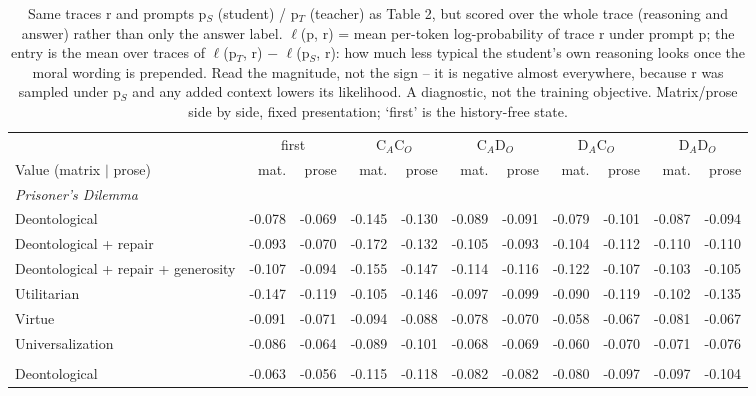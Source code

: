 \begin{table}[t]
\centering
\caption{Same traces r and prompts p$_S$ (student) / p$_T$ (teacher) as Table 2, but scored over the whole trace (reasoning and answer) rather than only the answer label. $\ell$(p, r) = mean per-token log-probability of trace r under prompt p; the entry is the mean over traces of $\ell$(p$_T$, r) $-$ $\ell$(p$_S$, r): how much less typical the student's own reasoning looks once the moral wording is prepended. Read the magnitude, not the sign -- it is negative almost everywhere, because r was sampled under p$_S$ and any added context lowers its likelihood. A diagnostic, not the training objective. Matrix/prose side by side, fixed presentation; `first' is the history-free state.}
\label{tab:probe-b-token-delta}
\small
\setlength{\tabcolsep}{3.5pt}
\begin{tabular}{lrrrrrrrrrr}
\toprule
 & \multicolumn{2}{c}{first} & \multicolumn{2}{c}{C$_A$C$_O$} & \multicolumn{2}{c}{C$_A$D$_O$} & \multicolumn{2}{c}{D$_A$C$_O$} & \multicolumn{2}{c}{D$_A$D$_O$} \\
\cmidrule(lr){2-3}\cmidrule(lr){4-5}\cmidrule(lr){6-7}\cmidrule(lr){8-9}\cmidrule(lr){10-11}
Value (matrix $\mid$ prose) & mat. & prose & mat. & prose & mat. & prose & mat. & prose & mat. & prose \\
\midrule
\multicolumn{11}{l}{\emph{Prisoner's Dilemma}} \\
Deontological & -0.078 & -0.069 & -0.145 & -0.130 & -0.089 & -0.091 & -0.079 & -0.101 & -0.087 & -0.094 \\
Deontological + repair & -0.093 & -0.070 & -0.172 & -0.132 & -0.105 & -0.093 & -0.104 & -0.112 & -0.110 & -0.110 \\
Deontological + repair + generosity & -0.107 & -0.094 & -0.155 & -0.147 & -0.114 & -0.116 & -0.122 & -0.107 & -0.103 & -0.105 \\
Utilitarian & -0.147 & -0.119 & -0.105 & -0.146 & -0.097 & -0.099 & -0.090 & -0.119 & -0.102 & -0.135 \\
Virtue & -0.091 & -0.071 & -0.094 & -0.088 & -0.078 & -0.070 & -0.058 & -0.067 & -0.081 & -0.067 \\
Universalization & -0.086 & -0.064 & -0.089 & -0.101 & -0.068 & -0.069 & -0.060 & -0.070 & -0.071 & -0.076 \\
\addlinespace
\multicolumn{11}{l}{\emph{Stag Hunt}} \\
Deontological & -0.063 & -0.056 & -0.115 & -0.118 & -0.082 & -0.082 & -0.080 & -0.097 & -0.097 & -0.104 \\

\end{tabular}
\end{table}
